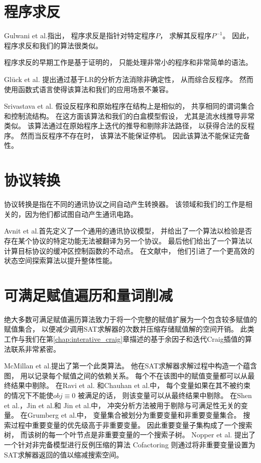 \section{程序求反}\label{subsec_proinv}
Gulwani et al.指出，
程序求反是指针对特定程序$P$，
求解其反程序$P^{-1}$。
因此，
程序求反和我们的算法很类似。

程序求反的早期工作是基于证明的，
只能处理非常小的程序和非常简单的语法。

Gl\"{u}ck et al.  提出通过基于LR的分析方法消除非确定性，
从而综合反程序。
然而使用函数式语言使得该算法和我们的应用场景不兼容。

Srivastava et al. 假设反程序和原始程序在结构上是相似的，
共享相同的谓词集合和控制流结构。
在这方面该算法和我们的白盒模型假设，
尤其是流水线推导非常类似。
该算法通过在原始程序上迭代的推导和剔除非法路径，
以获得合法的反程序。
然而当反程序不存在时，
该算法不能保证停机。
因此该算法不能保证完备性。



\section{协议转换}
协议转换是指在不同的通讯协议之间自动产生转换器。
该领域和我们的工作是相关的，因为他们都试图自动产生通讯电路。

Avnit et al.首先定义了一个通用的通讯协议模型，
并给出了一个算法以检验是否存在某个协议的特定功能无法被翻译为另一个协议。
最后他们给出了一个算法以计算目标协议的缓冲区控制函数的不动点。
在文献中，
他们引进了一个更高效的状态空间探索算法以提升整体性能。

\section{可满足赋值遍历和量词削减}\label{subsec_relallsat}

绝大多数可满足赋值遍历算法致力于将一个完整的赋值扩展为一个包含较多赋值的赋值集合，
以便减少调用SAT求解器的次数并压缩存储赋值解的空间开销。
此类工作与我们在第\ref{chap:interative_craig}章描述的基于余因子和迭代Craig插值的算法联系非常紧密。

McMillan et al.提出了第一个此类算法。
他在SAT求解器求解过程中构造一个蕴含图，
用以记录每个赋值之间的依赖关系。
每个不在该图中的赋值变量都可以从最终结果中剔除。
在Ravi et al. 和Chauhan et al.中，
每个变量如果在其不被约束的情况下不能使$obj\equiv 0$ 被满足的话，
则该变量可以从最终结果中剔除。
在Shen et al.，Jin et al.和 Jin et al.中，
冲突分析方法被用于剔除与可满足性无关的变量。
在Grumberg et al.中，
变量集合被划分为重要变量和非重要变量集合。
搜索过程中重要变量的优先级高于非重要变量。
因此重要变量子集构成了一个搜索树，
而该树的每一个叶节点是非重要变量的一个搜索子树。
Nopper et al. 提出了一个针对非完备模型进行反例压缩的算法
Cofactoring  则通过将非重要变量设置为SAT求解器返回的值以缩减搜索空间。

